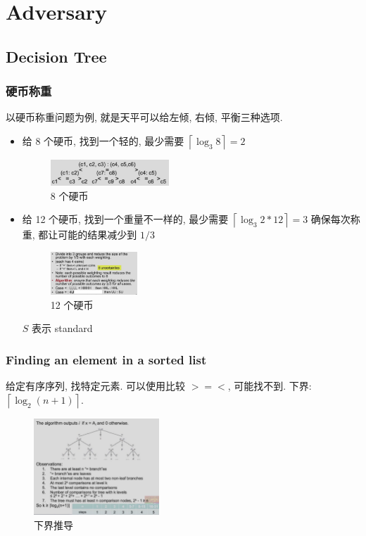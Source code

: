 \newpage
\section{Adversary}
\subsection{Decision Tree}
\subsubsection{硬币称重}
以硬币称重问题为例, 就是天平可以给左倾, 右倾, 平衡三种选项. 

\begin{itemize}
    \item 给 8 个硬币, 找到一个轻的, 最少需要 $\left\lceil \log_3 8 \right\rceil=2$
    \begin{figure}[!htb]
        \centering
        \includegraphics[width=0.42\textwidth]{pic/DAA2/8coin.png}
        \caption{8 个硬币}
    \end{figure}
    
    \item 给 12 个硬币, 找到一个重量不一样的, 最少需要 $\left\lceil \log_3 2*12 \right\rceil=3$
    \subitem 确保每次称重, 都让可能的结果减少到 $1/3$

    \begin{figure}[!htb]
        \centering
        \includegraphics[width=0.309\textwidth]{pic/DAA2/12coin.png}
        \caption{12 个硬币}
    \end{figure}
    $S$ 表示 standard
\end{itemize}

\subsubsection{Finding an element in a sorted list}
给定有序序列, 找特定元素. 可以使用比较 $>=<$, 可能找不到. 下界: $\left\lceil \log_2(n+1) \right\rceil$. 

\begin{figure}[!htb]
    \centering
    \includegraphics[width=0.42\textwidth]{pic/DAA2/sorted下界.png}
    \caption{下界推导}
\end{figure}


